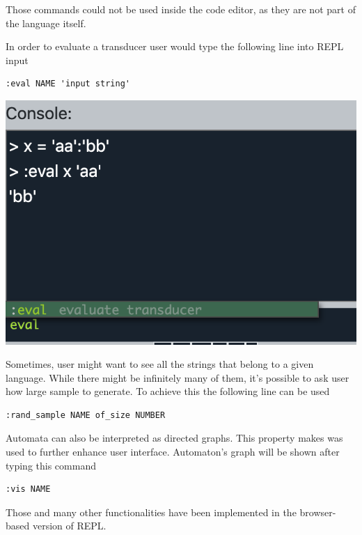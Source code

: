 Those commands could not be used inside the code editor, as they are not part of the language itself. 

In order to evaluate a transducer user would type the following line into REPL input
\begin{lstlisting}
:eval NAME 'input string'
\end{lstlisting}
 \begin{center}
	\includegraphics[scale=1.13]{eval.png}
\end{center}
Sometimes, user might want to see all the strings that belong to a given language. While there might be infinitely many of them, it's possible to ask user how large sample to generate. To achieve this the following line can be used
\begin{lstlisting}
:rand_sample NAME of_size NUMBER
\end{lstlisting}
Automata can also be interpreted as directed graphs. This property makes was used to further enhance user interface. Automaton's graph will be shown after typing this command
\begin{lstlisting}
:vis NAME
\end{lstlisting}
Those and many other functionalities have been implemented in the browser-based version of REPL. 

